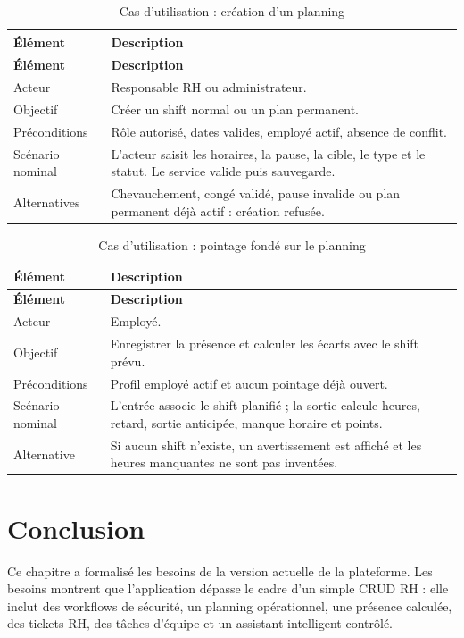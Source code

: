 \documentclass[12pt,a4paper]{report}
\begin{document}
\begin{longtable}{>{\raggedright\arraybackslash}p{4cm}>{\raggedright\arraybackslash}p{10cm}}
\caption{Cas d'utilisation : création d'un planning}\label{tab:cu-planning}\\
\toprule
\textbf{Élément} & \textbf{Description} \\
\midrule
\endfirsthead
\toprule
\textbf{Élément} & \textbf{Description} \\
\midrule
\endhead
Acteur & Responsable RH ou administrateur. \\
Objectif & Créer un shift normal ou un plan permanent. \\
Préconditions & Rôle autorisé, dates valides, employé actif, absence de conflit. \\
Scénario nominal & L'acteur saisit les horaires, la pause, la cible, le type et le statut. Le service valide puis sauvegarde. \\
Alternatives & Chevauchement, congé validé, pause invalide ou plan permanent déjà actif : création refusée. \\
\bottomrule
\end{longtable}

\begin{longtable}{>{\raggedright\arraybackslash}p{4cm}>{\raggedright\arraybackslash}p{10cm}}
\caption{Cas d'utilisation : pointage fondé sur le planning}\label{tab:cu-pointage}\\
\toprule
\textbf{Élément} & \textbf{Description} \\
\midrule
\endfirsthead
\toprule
\textbf{Élément} & \textbf{Description} \\
\midrule
\endhead
Acteur & Employé. \\
Objectif & Enregistrer la présence et calculer les écarts avec le shift prévu. \\
Préconditions & Profil employé actif et aucun pointage déjà ouvert. \\
Scénario nominal & L'entrée associe le shift planifié ; la sortie calcule heures, retard, sortie anticipée, manque horaire et points. \\
Alternative & Si aucun shift n'existe, un avertissement est affiché et les heures manquantes ne sont pas inventées. \\
\bottomrule
\end{longtable}


\section{Conclusion}
Ce chapitre a formalisé les besoins de la version actuelle de la plateforme. Les besoins montrent que l'application dépasse le cadre d'un simple CRUD RH : elle inclut des workflows de sécurité, un planning opérationnel, une présence calculée, des tickets RH, des tâches d'équipe et un assistant intelligent contrôlé.
\end{document}
